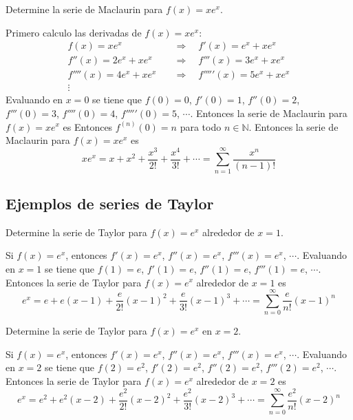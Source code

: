 \documentclass{article}
\begin{document}
\begin{example}{8}
    Determine la serie de Maclaurin para $f(x) = xe^x$.
\end{example}
Primero calculo las derivadas de $f(x) = xe^x$:
\begin{align*}
    f(x) = xe^x \quad &\Rightarrow \quad f'(x) = e^x + xe^x \\
    f''(x) = 2e^x + xe^x \quad &\Rightarrow \quad f'''(x) = 3e^x + xe^x \\
    f''''(x) = 4e^x + xe^x \quad &\Rightarrow \quad f'''''(x) = 5e^x + xe^x \\
    \vdots
\end{align*}
Evaluando en $x=0$ se tiene que $f(0) = 0$, $f'(0) = 1$, $f''(0) = 2$, $f'''(0) = 3$, $f''''(0) = 4$, $f'''''(0) = 5$, $\cdots$. Entonces la serie de Maclaurin para $f(x) = xe^x$ es
Entonces $f^{(n)}(0) = n$ para todo $n \in \mathbb{N}$. Entonces la serie de Maclaurin para $f(x) = xe^x$ es
\begin{equation*}
    xe^x = x + x^2 + \frac{x^3}{2!} + \frac{x^4}{3!} + \cdots = \sum_{n=1}^{\infty} \frac{x^n}{(n-1)!}
\end{equation*}


\subsection{Ejemplos de series de Taylor}

\begin{example}{1}
    Determine la serie de Taylor para $f(x) = e^x$ alrededor de $x=1$.
\end{example}
Si $f(x) = e^x$, entonces $f'(x) = e^x$, $f''(x) = e^x$, $f'''(x) = e^x$, $\cdots$. Evaluando en $x=1$ se tiene que $f(1) = e$, $f'(1) = e$, $f''(1) = e$, $f'''(1) = e$, $\cdots$. Entonces la serie de Taylor para $f(x) = e^x$ alrededor de $x=1$ es
\begin{equation*}
    e^x = e + e(x-1) + \frac{e}{2!}(x-1)^2 + \frac{e}{3!}(x-1)^3 + \cdots = \sum_{n=0}^{\infty} \frac{e}{n!}(x-1)^n
\end{equation*}

\newpage
\begin{example}{2}
    Determine la serie de Taylor para $f(x)= e^x$ en $x=2$.
\end{example}
Si $f(x) = e^x$, entonces $f'(x) = e^x$, $f''(x) = e^x$, $f'''(x) = e^x$, $\cdots$. Evaluando en $x=2$ se tiene que $f(2) = e^2$, $f'(2) = e^2$, $f''(2) = e^2$, $f'''(2) = e^2$, $\cdots$. Entonces la serie de Taylor para $f(x) = e^x$ alrededor de $x=2$ es
\begin{equation*}
    e^x = e^2 + e^2(x-2) + \frac{e^2}{2!}(x-2)^2 + \frac{e^2}{3!}(x-2)^3 + \cdots = \sum_{n=0}^{\infty} \frac{e^2}{n!}(x-2)^n
\end{equation*} 
\end{document}
